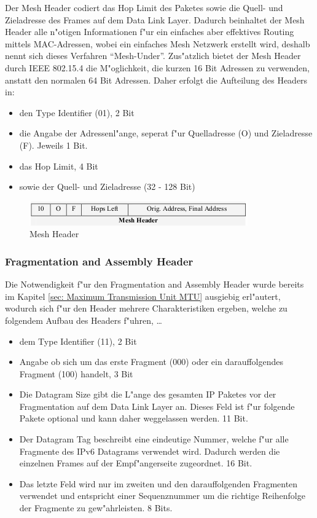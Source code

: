 \documentclass[final]{lktseminar}
\begin{document}
Der Mesh Header codiert das Hop Limit des Paketes sowie die Quell- und Zieladresse des Frames auf dem Data Link Layer.
Dadurch beinhaltet der Mesh Header alle n"otigen Informationen f"ur ein einfaches aber effektives Routing mittels
MAC-Adressen, wobei ein einfaches Mesh Netzwerk erstellt wird, deshalb nennt sich dieses Verfahren ``Mesh-Under''.
Zus"atzlich bietet der Mesh Header durch IEEE 802.15.4 die M"oglichkeit, die kurzen 16 Bit Adressen zu verwenden, anstatt
den normalen 64 Bit Adressen.
Daher erfolgt die Aufteilung des Headers in:
\begin{itemize}
    \item den Type Identifier (01), 2 Bit
    \item die Angabe der Adressenl"ange, seperat f"ur Quelladresse (O) und Zieladresse (F). Jeweils 1 Bit.
    \item das Hop Limit, 4 Bit
    \item sowie der Quell- und Zieladresse (32 - 128 Bit)
\end{itemize}

\begin{figure}[h]
    \centering
    \includegraphics{mesh_header.png}
    \caption{Mesh Header \cite{6lowpan_architecture}}
    \label{fig:Mesh Header}
\end{figure}

\subsubsection{Fragmentation and Assembly Header}
\label{sec: Fragmentation and Assembly Header}

Die Notwendigkeit f"ur den Fragmentation and Assembly Header wurde bereits im Kapitel \ref{sec: Maximum Transmission Unit MTU} ausgiebig erl"autert,
wodurch sich f"ur den Header mehrere Charakteristiken ergeben, welche zu folgendem Aufbau des Headers f"uhren, \dots
\begin{itemize}
    \item dem Type Identifier (11), 2 Bit
    \item Angabe ob sich um das erste Fragment (000) oder ein darauffolgendes Fragment (100) handelt, 3 Bit
    \item Die Datagram Size gibt die L"ange des gesamten IP Paketes vor der Fragmentation auf dem Data Link Layer an.
    Dieses Feld ist f"ur folgende Pakete optional und kann daher weggelassen werden. 11 Bit.
    \item Der Datagram Tag beschreibt eine eindeutige Nummer, welche f"ur alle Fragmente des IPv6 Datagrams verwendet wird.
    Dadurch werden die einzelnen Frames auf der Empf"angerseite zugeordnet. 16 Bit.
    \item Das letzte Feld wird nur im zweiten und den darauffolgenden Fragmenten verwendet und entspricht einer Sequenznummer
    um die richtige Reihenfolge der Fragmente zu gew"ahrleisten. 8 Bits.
\end{itemize}
\end{document}
